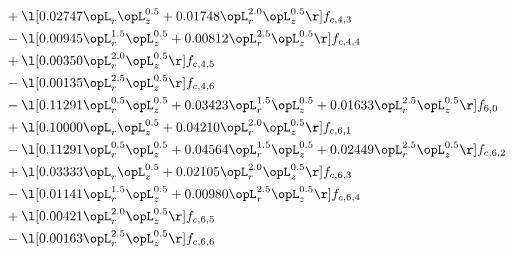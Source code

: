 \begin{alignat}{2}
& + \l[  0.02747 \opL_r \opL_z^{0.5} +  0.01748 \opL_r^{2.0} \opL_z^{0.5}  \r] f_{c,4,3} \nonumber \\ 
& - \l[  0.00945 \opL_r^{1.5} \opL_z^{0.5} +  0.00812 \opL_r^{2.5} \opL_z^{0.5}  \r] f_{c,4,4} \nonumber \\ 
& + \l[  0.00350 \opL_r^{2.0} \opL_z^{0.5}  \r] f_{c,4,5} \nonumber \\ 
& - \l[  0.00135 \opL_r^{2.5} \opL_z^{0.5}  \r] f_{c,4,6} \nonumber \\ 
& - \l[  0.11291 \opL_r^{0.5} \opL_z^{0.5} +  0.03423 \opL_r^{1.5} \opL_z^{0.5} +  0.01633 \opL_r^{2.5} \opL_z^{0.5}  \r] f_{6,0} \nonumber \\ 
& + \l[  0.10000 \opL_r \opL_z^{0.5} +  0.04210 \opL_r^{2.0} \opL_z^{0.5}  \r] f_{c,6,1} \nonumber \\ 
& - \l[  0.11291 \opL_r^{0.5} \opL_z^{0.5} +  0.04564 \opL_r^{1.5} \opL_z^{0.5} +  0.02449 \opL_r^{2.5} \opL_z^{0.5}  \r] f_{c,6,2} \nonumber \\ 
& + \l[  0.03333 \opL_r \opL_z^{0.5} +  0.02105 \opL_r^{2.0} \opL_z^{0.5}  \r] f_{c,6,3} \nonumber \\ 
& - \l[  0.01141 \opL_r^{1.5} \opL_z^{0.5} +  0.00980 \opL_r^{2.5} \opL_z^{0.5}  \r] f_{c,6,4} \nonumber \\ 
& + \l[  0.00421 \opL_r^{2.0} \opL_z^{0.5}  \r] f_{c,6,5} \nonumber \\ 
& - \l[  0.00163 \opL_r^{2.5} \opL_z^{0.5}  \r] f_{c,6,6} \nonumber \\ 
\end{alignat} 


